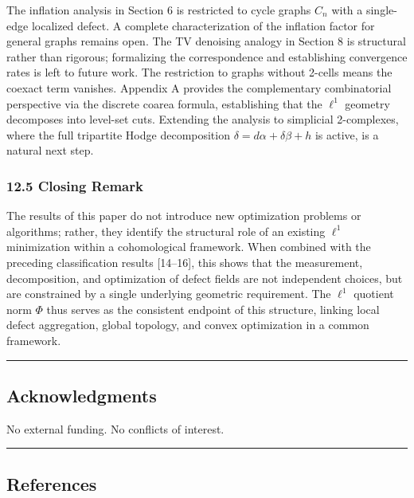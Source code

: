 \documentclass[
]{article}
\begin{document}
The inflation analysis in Section 6 is restricted to cycle graphs
\(C_n\) with a single-edge localized defect. A complete characterization
of the inflation factor for general graphs remains open. The TV
denoising analogy in Section 8 is structural rather than rigorous;
formalizing the correspondence and establishing convergence rates is
left to future work. The restriction to graphs without 2-cells means the
coexact term vanishes. Appendix A provides the complementary
combinatorial perspective via the discrete coarea formula, establishing
that the \(\ell^1\) geometry decomposes into level-set cuts. Extending
the analysis to simplicial 2-complexes, where the full tripartite Hodge
decomposition \(\delta = d\alpha + \delta\beta + h\) is active, is a
natural next step.

\subsubsection{12.5 Closing Remark}\label{closing-remark}

The results of this paper do not introduce new optimization problems or
algorithms; rather, they identify the structural role of an existing
\(\ell^1\) minimization within a cohomological framework. When combined
with the preceding classification results {[}14--16{]}, this shows that
the measurement, decomposition, and optimization of defect fields are
not independent choices, but are constrained by a single underlying
geometric requirement. The \(\ell^1\) quotient norm \(\Phi\) thus serves
as the consistent endpoint of this structure, linking local defect
aggregation, global topology, and convex optimization in a common
framework.

\begin{center}\rule{0.5\linewidth}{0.5pt}\end{center}

\subsection{Acknowledgments}\label{acknowledgments}

No external funding. No conflicts of interest.

\begin{center}\rule{0.5\linewidth}{0.5pt}\end{center}

\subsection{References}\label{references}
\end{document}
